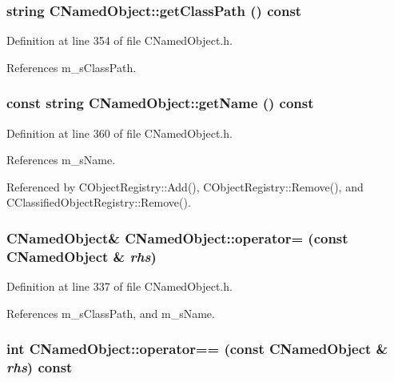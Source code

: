 \subsubsection{\setlength{\rightskip}{0pt plus 5cm}string CNamed\-Object::get\-Class\-Path () const\hspace{0.3cm}{\tt  [inline]}}\label{classCNamedObject_a5}




Definition at line 354 of file CNamed\-Object.h.

References m\_\-s\-Class\-Path.
\subsubsection{\setlength{\rightskip}{0pt plus 5cm}const string CNamed\-Object::get\-Name () const\hspace{0.3cm}{\tt  [inline]}}\label{classCNamedObject_a6}




Definition at line 360 of file CNamed\-Object.h.

References m\_\-s\-Name.

Referenced by CObject\-Registry::Add(), CObject\-Registry::Remove(), and CClassified\-Object\-Registry::Remove().
\subsubsection{\setlength{\rightskip}{0pt plus 5cm}CNamed\-Object\& CNamed\-Object::operator= (const CNamed\-Object \& {\em rhs})\hspace{0.3cm}{\tt  [inline]}}\label{classCNamedObject_a3}




Definition at line 337 of file CNamed\-Object.h.

References m\_\-s\-Class\-Path, and m\_\-s\-Name.
\subsubsection{\setlength{\rightskip}{0pt plus 5cm}int CNamed\-Object::operator== (const CNamed\-Object \& {\em rhs}) const\hspace{0.3cm}{\tt  [inline]}}\label{classCNamedObject_a4}




